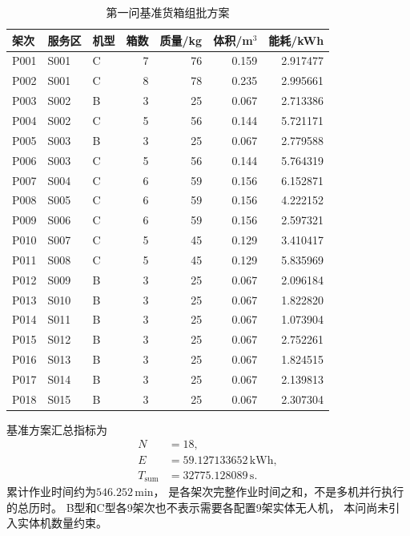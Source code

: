 \documentclass[bwprint]{gmcmthesis}
\begin{document}
\begin{table}[htbp]
    \centering
    \caption{第一问基准货箱组批方案}
    \label{tab:q1_batches}
    \small
    \begin{tabular}{lllrrrr}
        \toprule
        架次 & 服务区 & 机型 & 箱数 &
        质量/kg & 体积/m$^3$ & 能耗/kWh \\
        \midrule
        P001 & S001 & C & 7 & 76 & 0.159 & 2.917477 \\
        P002 & S001 & C & 8 & 78 & 0.235 & 2.995661 \\
        P003 & S002 & B & 3 & 25 & 0.067 & 2.713386 \\
        P004 & S002 & C & 5 & 56 & 0.144 & 5.721171 \\
        P005 & S003 & B & 3 & 25 & 0.067 & 2.779588 \\
        P006 & S003 & C & 5 & 56 & 0.144 & 5.764319 \\
        P007 & S004 & C & 6 & 59 & 0.156 & 6.152871 \\
        P008 & S005 & C & 6 & 59 & 0.156 & 4.222152 \\
        P009 & S006 & C & 6 & 59 & 0.156 & 2.597321 \\
        P010 & S007 & C & 5 & 45 & 0.129 & 3.410417 \\
        P011 & S008 & C & 5 & 45 & 0.129 & 5.835969 \\
        P012 & S009 & B & 3 & 25 & 0.067 & 2.096184 \\
        P013 & S010 & B & 3 & 25 & 0.067 & 1.822820 \\
        P014 & S011 & B & 3 & 25 & 0.067 & 1.073904 \\
        P015 & S012 & B & 3 & 25 & 0.067 & 2.752261 \\
        P016 & S013 & B & 3 & 25 & 0.067 & 1.824515 \\
        P017 & S014 & B & 3 & 25 & 0.067 & 2.139813 \\
        P018 & S015 & B & 3 & 25 & 0.067 & 2.307304 \\
        \bottomrule
    \end{tabular}
\end{table}

基准方案汇总指标为
\begin{align}
    N &=18,\\
    E &=59.127133652\,\mathrm{kWh},\\
    T_{\mathrm{sum}}
      &=32775.128089\,\mathrm{s}.
\end{align}
累计作业时间约为$546.252\,\mathrm{min}$，
是各架次完整作业时间之和，不是多机并行执行的总历时。
B型和C型各9架次也不表示需要各配置9架实体无人机，
本问尚未引入实体机数量约束。
\end{document}

